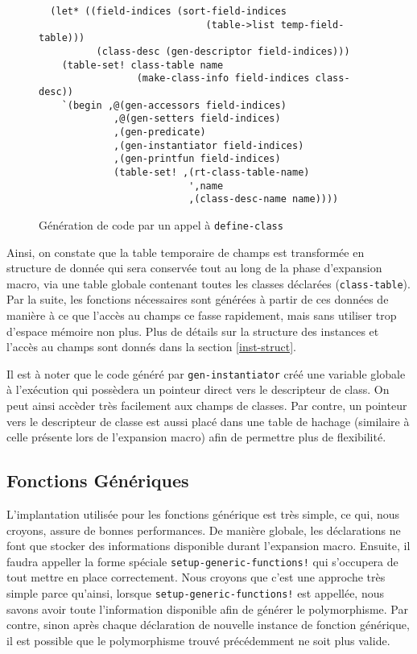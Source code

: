 \documentclass[letterpaper,12pt]{book}
\begin{document}
      \begin{figure}[h!]
        \begin{lstlisting}
  (let* ((field-indices (sort-field-indices
                             (table->list temp-field-table)))
          (class-desc (gen-descriptor field-indices)))
    (table-set! class-table name 
                 (make-class-info field-indices class-desc))
    `(begin ,@(gen-accessors field-indices)
             ,@(gen-setters field-indices)
             ,(gen-predicate)
             ,(gen-instantiator field-indices)
             ,(gen-printfun field-indices)
             (table-set! ,(rt-class-table-name)
                          ',name
                          ,(class-desc-name name))))
        \end{lstlisting}
        \caption{Génération de code par un appel à \texttt{define-class}}
        \label{class-code-gen}
      \end{figure}

      Ainsi, on constate que la table temporaire de champs est
      transformée en structure de donnée qui sera conservée tout au
      long de la phase d'expansion macro, via une table globale
      contenant toutes les classes déclarées
      (\texttt{class-table}). Par la suite, les fonctions nécessaires
      sont générées à partir de ces données de manière à ce que
      l'accès au champs ce fasse rapidement, mais sans utiliser trop
      d'espace mémoire non plus. Plus de détails sur la structure des
      instances et l'accès au champs sont donnés dans la section
      \ref{inst-struct}.

      Il est à noter que le code généré par \texttt{gen-instantiator}
      créé une variable globale à l'exécution qui possèdera un
      pointeur direct vers le descripteur de class. On peut ainsi
      accèder très facilement aux champs de classes. Par contre, un
      pointeur vers le descripteur de classe est aussi placé dans une
      table de hachage (similaire à celle présente lors de l'expansion
      macro) afin de permettre plus de flexibilité.

  \subsection{Fonctions Génériques}
    L'implantation utilisée pour les fonctions générique est très
    simple, ce qui, nous croyons, assure de bonnes performances. De
    manière globale, les déclarations ne font que stocker des
    informations disponible durant l'expansion macro. Ensuite, il
    faudra appeller la forme spéciale
    \texttt{setup-generic-functions!} qui s'occupera de tout mettre en
    place correctement. Nous croyons que c'est une approche très
    simple parce qu'ainsi, lorsque \texttt{setup-generic-functions!}
    est appellée, nous savons avoir toute l'information disponible
    afin de générer le polymorphisme. Par contre, sinon après chaque
    déclaration de nouvelle instance de fonction générique, il est
    possible que le polymorphisme trouvé précédemment ne soit plus
    valide.
\end{document}
